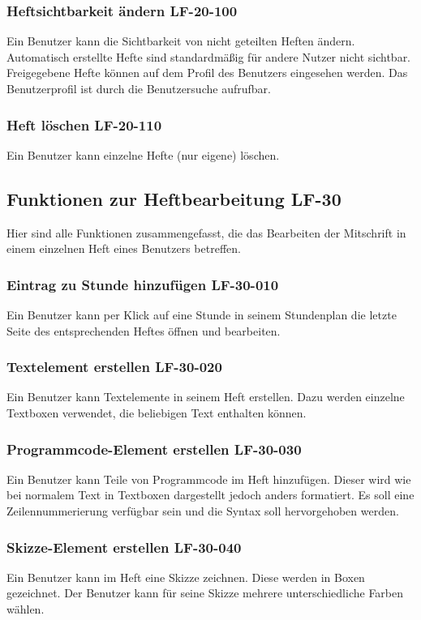 \documentclass[12pt,a4paper,oneside,ngerman]{scrartcl}
\begin{document}
\subsubsection{Heftsichtbarkeit ändern \hfill LF-20-100}
Ein Benutzer kann die Sichtbarkeit von nicht geteilten Heften ändern. Automatisch erstellte Hefte sind standardmäßig für andere Nutzer nicht sichtbar. Freigegebene Hefte können auf dem Profil des Benutzers eingesehen werden. Das Benutzerprofil ist durch die Benutzersuche aufrufbar.

\subsubsection{Heft löschen \hfill LF-20-110}
Ein Benutzer kann einzelne Hefte (nur eigene) löschen.

\subsection[Funktionen zur Heftbearbeitung]{Funktionen zur Heftbearbeitung \hfill LF-30}
Hier sind alle Funktionen zusammengefasst, die das Bearbeiten der Mitschrift in einem einzelnen Heft eines Benutzers betreffen.

\subsubsection{Eintrag zu Stunde hinzufügen \hfill LF-30-010}
Ein Benutzer kann per Klick auf eine Stunde in seinem Stundenplan die letzte Seite des entsprechenden Heftes öffnen und bearbeiten.

\subsubsection{Textelement erstellen \hfill LF-30-020}
Ein Benutzer kann Textelemente in seinem Heft erstellen. Dazu werden einzelne Textboxen verwendet, die beliebigen Text enthalten können.

\subsubsection{Programmcode-Element erstellen \hfill LF-30-030}
Ein Benutzer kann Teile von Programmcode im Heft hinzufügen. Dieser wird wie bei normalem Text in Textboxen dargestellt jedoch anders formatiert. Es soll eine Zeilennummerierung verfügbar sein und die Syntax soll hervorgehoben werden.

\subsubsection{Skizze-Element erstellen \hfill LF-30-040}
Ein Benutzer kann im Heft eine Skizze zeichnen. Diese werden in Boxen gezeichnet. Der Benutzer kann für seine Skizze mehrere unterschiedliche Farben wählen.
\end{document}
